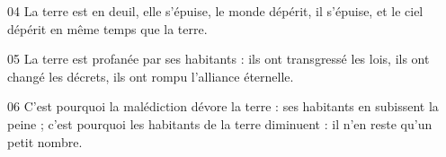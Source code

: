 
04 La terre est en deuil, elle s’épuise, le monde dépérit, il s’épuise, et le ciel dépérit en même temps que la terre.

05 La terre est profanée par ses habitants : ils ont transgressé les lois, ils ont changé les décrets, ils ont rompu l’alliance éternelle.

06 C’est pourquoi la malédiction dévore la terre : ses habitants en subissent la peine ; c’est pourquoi les habitants de la terre diminuent : il n’en reste qu’un petit nombre.
